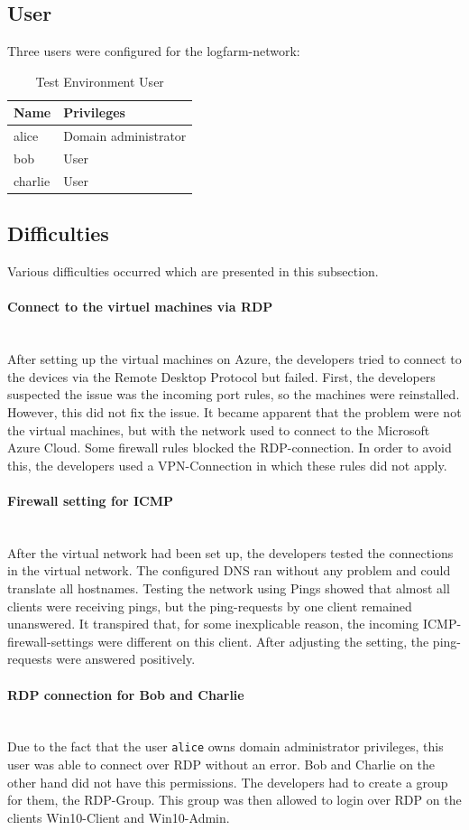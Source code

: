 \subsection{User}
Three users were configured for the logfarm-network:
\begin{table}[H]
    \centering
    \begin{tabular}{p{4cm} p{8cm}} \hline
        \textbf{Name} & \textbf{Privileges}  \\ \hline
        alice & Domain administrator  \\ \hline
        bob & User  \\ \hline
        charlie & User  \\ \hline
    \end{tabular}
    \caption{Test Environment User}
\end{table}

\subsection{Difficulties}
Various difficulties occurred which are presented in this subsection.
\paragraph{Connect to the virtuel machines via RDP} \ \\
After setting up the virtual machines on Azure, the developers tried to connect to the devices via the Remote Desktop Protocol but failed. First, the developers suspected the issue was the incoming port rules, so the machines were reinstalled. However, this did not fix the issue. It became apparent that the problem were not the virtual machines, but with the network used to connect to the Microsoft Azure Cloud. Some firewall rules blocked the RDP-connection. In order to avoid this, the developers used a VPN-Connection in which these rules did not apply.
\paragraph{Firewall setting for ICMP}\ \\
After the virtual network had been set up, the developers tested the connections in the virtual network. The configured DNS ran without any problem and could translate all hostnames. Testing the network using Pings showed that almost all clients were receiving pings, but the ping-requests by one client remained unanswered. It transpired that, for some inexplicable reason, the incoming ICMP-firewall-settings were different on this client. After adjusting the setting, the ping-requests were answered positively.

\paragraph{RDP connection for Bob and Charlie}\ \\
Due to the fact that the user \lstinline|alice| owns domain administrator privileges, this user was able to connect over RDP without an error. Bob and Charlie on the other hand did not have this permissions. The developers had to create a group for them, the RDP-Group. This group was then allowed to login over RDP on the clients Win10-Client and Win10-Admin. 